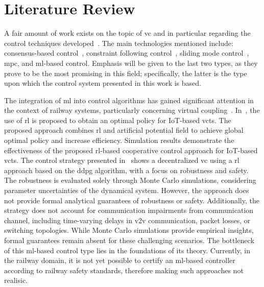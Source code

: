 

\section*{Literature Review}


 A fair amount of work exists on the topic of \gls{vc} and in particular regarding the control techniques developed~\cite{wu2023railway}. The main technologies mentioned include: consensus-based control~\cite{wu2023dynamics}, constraint following control~\cite{zhang2023optimal,wang2022constraint}, sliding mode control~\cite{park2022,liu2023method}, \gls{mpc}, and \gls{ml}-based control. Emphasis will be given to the last two types, as they prove to be the most promising in this field; specifically, the latter is the type upon which the control system presented in this work is based.

The integration of \gls{ml} into control algorithms has gained significant attention in the context of railway systems, particularly concerning virtual coupling~\cite{basile2022roadmap}. In~\cite{wang2021}, the use of \gls{rl} is proposed to obtain an optimal policy for IoT-based \gls{vcts}. The proposed approach combines \gls{rl} and artificial potential field to achieve global optimal policy and increase efficiency. Simulation results demonstrate the effectiveness of the proposed \gls{rl}-based cooperative control approach for IoT-based \gls{vcts}. The control strategy presented in~\cite{BASILE2024108120} shows a decentralized \gls{vc} using a \gls{rl} approach based on the \gls{ddpg} algorithm, with a focus on robustness and safety. The robustness is evaluated solely through Monte Carlo simulations, considering parameter uncertainties of the dynamical system. However, the approach does not provide formal analytical guarantees of robustness or safety. Additionally, the strategy does not account for communication impairments from communication channel, including time-varying delays in \gls{v2v} communication, packet losses, or switching topologies. While Monte Carlo simulations provide empirical insights, formal guarantees remain absent for these challenging scenarios.
%
The bottleneck of this \gls{ml}-based control type lies in the foundations of its theory. Currently, in the railway domain, it is not yet possible to certify an \gls{ml}-based controller according to railway safety standards, therefore making such approaches not realisic.


